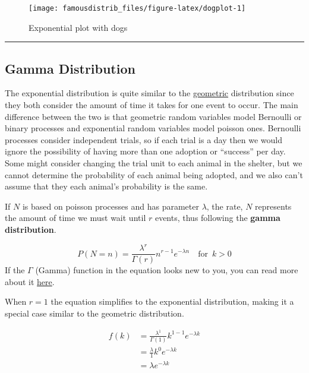 \documentclass[
]{article}
\begin{document}
\begin{figure}

{\centering \texttt{[image: famousdistrib\_files/figure-latex/dogplot-1]} 

}

\caption{Exponential plot with dogs}\label{fig:dogplot}
\end{figure}

\begin{center}\rule{0.5\linewidth}{0.5pt}\end{center}

\hypertarget{Gamma}{%
\subsection{Gamma Distribution}\label{Gamma}}

The exponential distribution is quite similar to the \protect\hyperlink{geometric}{geometric} distribution since they both consider the amount of time it takes for one event to occur. The main difference between the two is that geometric random variables model Bernoulli or binary processes and exponential random variables model poisson ones. Bernoulli processes consider independent trials, so if each trial is a day then we would ignore the possibility of having more than one adoption or ``success'' per day. Some might consider changing the trial unit to each animal in the shelter, but we cannot determine the probability of each animal being adopted, and we also can't assume that they each animal's probability is the same.

If \(N\) is based on poisson processes and has parameter \(\lambda\), the rate, \(N\) represents the amount of time we must wait until \(r\) events, thus following the \textbf{gamma distribution}.

\[ P(N=n)=\frac{\lambda^r}{\Gamma(r)}n^{r-1}e^{-\lambda n} \quad \textrm{for} \enspace k>0\]
If the \(\Gamma\) (Gamma) function in the equation looks new to you, you can read more about it \href{https://www.cantorsparadise.com/the-beautiful-gamma-function-and-the-genius-who-discovered-it-8778437565dc}{here}.

When \(r=1\) the equation simplifies to the exponential distribution, making it a special case similar to the geometric distribution.

\[ \begin{split}f(k)&=\frac{\lambda^1}{\Gamma(1)}k^{1-1}e^{-\lambda k} \\
&= \frac{\lambda}{1}k^0e^{-\lambda k} \\
&= \lambda e^{-\lambda k}
\end{split}\]
\end{document}
